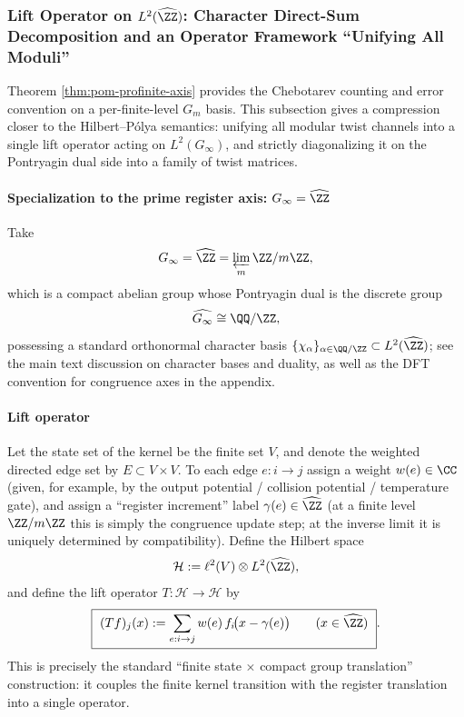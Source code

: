 \subsubsection{Lift Operator on \texorpdfstring{$L^2(\widehat{\ZZ})$}{L2(Zhat)}: Character Direct-Sum Decomposition and an Operator Framework ``Unifying All Moduli''}\label{subsec:profinite-operator-l2}
Theorem \ref{thm:pom-profinite-axis} provides the Chebotarev counting and error convention on a per-finite-level \(G_m\) basis.
This subsection gives a compression closer to the Hilbert--P{\'o}lya semantics: unifying all modular twist channels into a single lift operator acting on \(L^2(G_\infty)\), and strictly diagonalizing it on the Pontryagin dual side into a family of twist matrices.

\paragraph{Specialization to the prime register axis: \texorpdfstring{$G_\infty=\widehat{\ZZ}$}{G=Zhat}}
Take
\[
G_\infty=\widehat{\ZZ}=\varprojlim_m \ZZ/m\ZZ,
\]
which is a compact abelian group whose Pontryagin dual is the discrete group
\[
\widehat{G_\infty}\cong \QQ/\ZZ,
\]
possessing a standard orthonormal character basis \(\{\chi_\alpha\}_{\alpha\in\QQ/\ZZ}\subset L^2(\widehat{\ZZ})\); see the main text discussion on character bases and duality, as well as the DFT convention for congruence axes in the appendix.

\paragraph{Lift operator}
Let the state set of the kernel be the finite set \(V\), and denote the weighted directed edge set by \(E\subset V\times V\).
To each edge \(e:i\to j\) assign a weight \(w(e)\in\CC\) (given, for example, by the output potential / collision potential / temperature gate), and assign a ``register increment'' label
\(\gamma(e)\in \widehat{\ZZ}\)
(at a finite level \(\ZZ/m\ZZ\) this is simply the congruence update step; at the inverse limit it is uniquely determined by compatibility).
Define the Hilbert space
\[
\mathcal{H}:=\ell^2(V)\otimes L^2(\widehat{\ZZ}),
\]
and define the lift operator \(T:\mathcal{H}\to\mathcal{H}\) by
\[
\boxed{\ (Tf)_j(x):=\sum_{e:i\to j} w(e)\,f_i\!\bigl(x-\gamma(e)\bigr)\qquad(x\in\widehat{\ZZ})\ }.
\]
This is precisely the standard ``finite state \(\times\) compact group translation'' construction: it couples the finite kernel transition with the register translation into a single operator.

